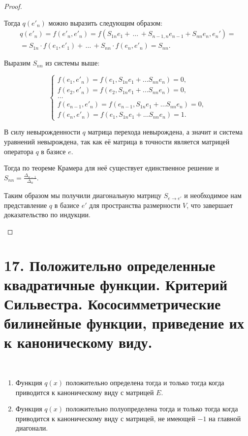 \begin{proof}
\begin{enumerate}
        Тогда $q(e'_n)$ можно выразить следующим образом: \begin{gather*}
            q(e'_n) = f(e'_n, e'_n) = f(S_{1n} e_1 + \, \dots \, + S_{n-1, n} e_{n-1} + S_{nn}e_n, e_n') = \\
            = S_{1n} \cdot f(e_1, e'_1) + \, \dots \, + S_{nn} \cdot f(e_n, e'_n) = S_{nn}. 
        \end{gather*}  
        
        Выразим $S_{nn}$ из системы выше:

        \begin{equation*}
            \begin{cases}
                f(e_1, e'_n) = f(e_1, S_{1n}e_1 + \dots S_{nn}e_n) = 0,         \\
                f(e_2, e'_n) = f(e_2, S_{1n}e_1 + \dots S_{nn}e_n) = 0,         \\
                \dots                                                           \\
                f(e_{n-1}, e'_n) = f(e_{n-1}, S_{1n}e_1 + \dots S_{nn}e_n) = 0, \\
                f(e_n, e'_n) = f(e_1, S_{1n}e_1 + \dots S_{nn}e_n) = 1.
            \end{cases}
        \end{equation*}

        В силу невырожденности $q$ матрица перехода невырождена, а значит и система уравнений невырождена,
        так как её матрица в точности является матрицей оператора $q$ в базисе $e$.
        
        Тогда по теореме Крамера для неё существует единственное решение и $S_{nn} = \frac{\Delta_{n-1}}{\Delta_n}$.

        Таким образом мы получили диагональную матрицу $S_{e \to e'}$ и необходимое нам представление 
        $q$ в базисе $e'$ для пространства размерности $V$, что завершает доказательство по индукции.
    \end{enumerate} 
\end{proof}

\section{17. Положительно определенные квадратичные функции. Критерий Сильвестра. Кососимметрические билинейные функции, приведение их к каноническому виду.}

\begin{proposition}~
    \label{pr10.1}
    \begin{enumerate}
        \item Функция $q(x)$ положительно определена тогда и только тогда когда приводится к каноническому
        виду с матрицей $E$.
        \item Функция $q(x)$ положительно полуопределена тогда и только тогда когда приводится к 
        каноническому виду с матрицей, не имеющей $-1$ на главной диагонали.
    \end{enumerate}
\end{proposition}

